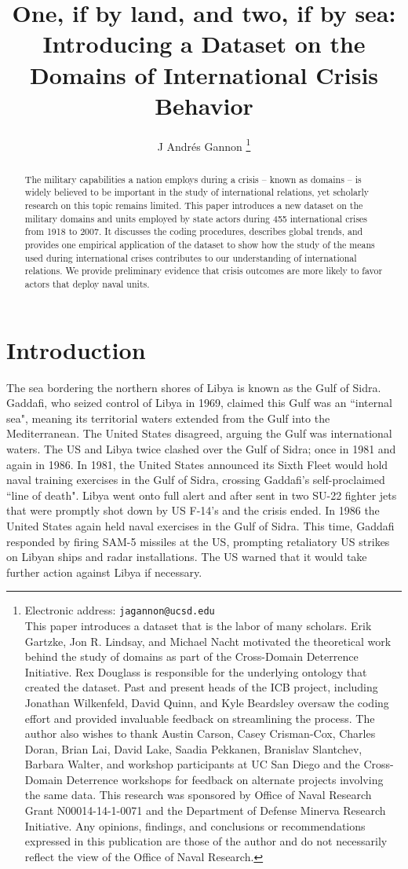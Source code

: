 \documentclass[12pt,letterpaper]{article}
\title{One, if by land, and two, if by sea: Introducing a Dataset on the Domains of International Crisis Behavior}
\author{J Andr\'{e}s Gannon%
	\thanks{Electronic address: \texttt{jagannon@ucsd.edu} \\ This paper introduces a dataset that is the labor of many scholars. Erik Gartzke, Jon R. Lindsay, and Michael Nacht motivated the theoretical work behind the study of domains as part of the Cross-Domain Deterrence Initiative. Rex Douglass is responsible for the underlying ontology that created the dataset. Past and present heads of the ICB project, including Jonathan Wilkenfeld, David Quinn, and Kyle Beardsley oversaw the coding effort and provided invaluable feedback on streamlining the process. The author also wishes to thank Austin Carson,  Casey Crisman-Cox, Charles Doran, Brian Lai, David Lake, Saadia Pekkanen, Branislav Slantchev, Barbara Walter, and workshop participants at UC San Diego and the Cross-Domain Deterrence workshops for feedback on alternate projects involving the same data. This research was sponsored by Office of Naval Research Grant N00014-14-1-0071 and the Department of Defense Minerva Research Initiative. Any opinions, findings, and conclusions or recommendations expressed in this publication are those of the author and do not necessarily reflect the view of the Office of Naval Research.}}
\affil{Center for Peace and Security Studies (cPASS) \\ Department of Political Science \\ University of California, San Diego}
\begin{document}
\maketitle
	
\begin{abstract}
The military capabilities a nation employs during a crisis -- known as domains -- is widely believed to be important in the study of international relations, yet scholarly research on this topic remains limited. This paper introduces a new dataset on the military domains and units employed by state actors during 455 international crises from 1918 to 2007. It discusses the coding procedures, describes global trends, and provides one empirical application of the dataset to show how the study of the means used during international crises contributes to our understanding of international relations. We provide preliminary evidence that crisis outcomes are more likely to favor actors that deploy naval units.
\end{abstract}

\section{Introduction}
The sea bordering the northern shores of Libya is known as the Gulf of Sidra. Gaddafi, who seized control of Libya in 1969, claimed this Gulf was an ``internal sea", meaning its territorial waters extended from the Gulf into the Mediterranean. The United States disagreed, arguing the Gulf was international waters. The US and Libya twice clashed over the Gulf of Sidra; once in 1981 and again in 1986. In 1981, the United States announced its Sixth Fleet would hold naval training exercises in the Gulf of Sidra, crossing Gaddafi's self-proclaimed ``line of death". Libya went onto full alert and after sent in two SU-22 fighter jets that were promptly shot down by US F-14's and the crisis ended. In 1986 the United States again held naval exercises in the Gulf of Sidra. This time, Gaddafi responded by firing SAM-5 missiles at the US, prompting retaliatory US strikes on Libyan ships and radar installations. The US warned that it would take further action against Libya if necessary.
\end{document}
